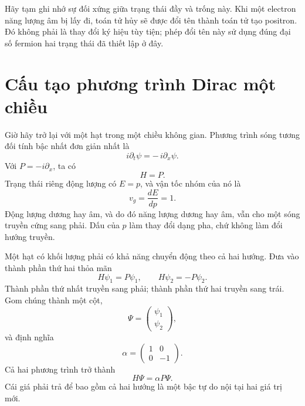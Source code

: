 Hãy tạm ghi nhớ sự đối xứng giữa trạng thái đầy và trống này. Khi một electron năng lượng âm bị lấy đi, toán tử hủy sẽ được đổi tên thành toán tử tạo positron. Đó không phải là thay đổi ký hiệu tùy tiện; phép đổi tên này sử dụng đúng đại số fermion hai trạng thái đã thiết lập ở đây.

\section{Cấu tạo phương trình Dirac một chiều}

Giờ hãy trở lại với một hạt trong một chiều không gian. Phương trình sóng tương đối tính bậc nhất đơn giản nhất là
\begin{equation}
i\partial_t\psi=-\,i\partial_x\psi.
\label{eq:l10-right-mover}
\end{equation}
Với \(P=-i\partial_x\), ta có
\begin{equation}
H=P.
\end{equation}
Trạng thái riêng động lượng có \(E=p\), và vận tốc nhóm của nó là
\begin{equation}
v_g=\frac{dE}{dp}=1.
\end{equation}
Động lượng dương hay âm, và do đó năng lượng dương hay âm, vẫn cho một sóng truyền cứng sang phải. Dấu của \(p\) làm thay đổi dạng pha, chứ không làm đổi hướng truyền.

Một hạt có khối lượng phải có khả năng chuyển động theo cả hai hướng. Đưa vào thành phần thứ hai thỏa mãn
\begin{equation}
H\psi_1=P\psi_1,
\qquad
H\psi_2=-P\psi_2.
\label{eq:l10-two-directions}
\end{equation}
Thành phần thứ nhất truyền sang phải; thành phần thứ hai truyền sang trái. Gom chúng thành một cột,
\begin{equation}
\Psi=
\begin{pmatrix}
\psi_1\\
\psi_2
\end{pmatrix},
\end{equation}
và định nghĩa
\begin{equation}
\alpha=
\begin{pmatrix}
1&0\\
0&-1
\end{pmatrix}.
\end{equation}
Cả hai phương trình trở thành
\begin{equation}
H\Psi=\alpha P\Psi.
\label{eq:l10-massless-one-d}
\end{equation}
Cái giá phải trả để bao gồm cả hai hướng là một bậc tự do nội tại hai giá trị mới.

